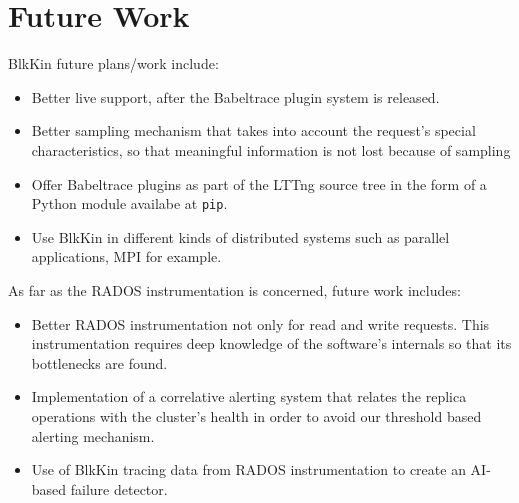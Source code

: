 \section{Future Work}
BlkKin future plans/work include:
\begin{itemize}
\item Better live support, after the Babeltrace plugin system is released.
\item Better sampling mechanism that takes into account the request's special
characteristics, so that meaningful information is not lost because of sampling
\item Offer Babeltrace plugins as part of the LTTng source tree in the form of a
Python module availabe at \texttt{pip}.
\item Use BlkKin in different kinds of distributed systems such as parallel
applications, MPI for example.
\end{itemize}

As far as the RADOS instrumentation is concerned, future work includes:
\begin{itemize}
\item Better RADOS instrumentation not only for read and write requests. This
instrumentation requires deep knowledge of the software's internals so that its
bottlenecks are found.
\item Implementation of a correlative alerting system that relates the
replica operations with the cluster's health in order to avoid our threshold
based alerting mechanism.
\item Use of BlkKin tracing data from RADOS instrumentation to create an
AI-based failure detector.
\end{itemize}
